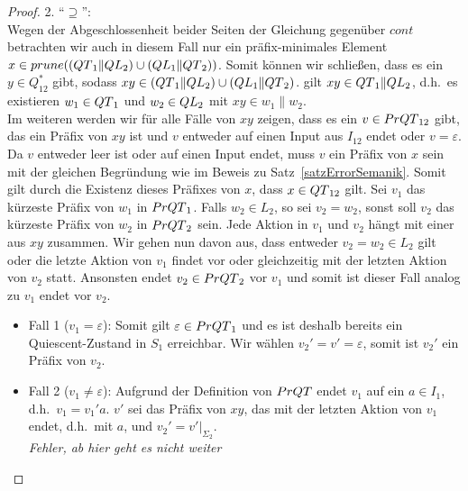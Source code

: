\begin{proof}
  2. ``$\supseteq$'':\\
  Wegen der Abgeschlossenheit beider Seiten der Gleichung gegenüber $cont$
  betrachten wir auch in diesem Fall nur ein präfix-minimales Element $x\in
  prune((QT{}_1\|QL{}_2)\cup (QL{}_1\|QT{}_2))$. Somit können wir schließen, dass es
  ein $y\in Q_{12}^*$ gibt, sodass $xy\in (QT{}_1\|QL{}_2)\cup (QL{}_1\|QT{}_2)$.
  \OBdA{} gilt $xy\in QT{}_1\|QL{}_2$, d.h.\ es existieren $w_1\in QT{}_1$ und
  $w_2\in QL{}_2$ mit $xy\in w_1\| w_2$.\\
  Im weiteren werden wir für alle Fälle von $xy$ zeigen, dass es ein $v\in
  PrQT{}_{12}$ gibt, das ein Präfix von $xy$ ist und $v$ entweder auf einen Input
  aus $I_{12}$ endet oder $v=\varepsilon$. Da $v$ entweder leer ist oder auf
  einen Input endet, muss $v$ ein Präfix von $x$ sein mit der gleichen
  Begründung wie im Beweis zu Satz~\ref{satzErrorSemanik}. Somit gilt durch die
  Existenz dieses Präfixes von $x$, dass $x\in QT{}_{12}$ gilt. Sei $v_1$ das
  kürzeste Präfix von $w_1$ in $PrQT{}_1$. Falls $w_2\in L_2$, so sei $v_2=w_2$,
  sonst soll $v_2$ das kürzeste Präfix von $w_2$ in $PrQT{}_2$ sein. Jede Aktion
  in $v_1$ und $v_2$ hängt mit einer aus $xy$ zusammen. Wir gehen nun davon
  aus, dass entweder $v_2=w_2\in L_2$ gilt oder die letzte Aktion von $v_1$
  findet vor oder gleichzeitig mit der letzten Aktion von $v_2$ statt.
  Ansonsten endet $v_2\in PrQT{}_2$ vor $v_1$ und somit ist dieser Fall analog zu
  $v_1$ endet vor $v_2$.
  \begin{itemize}
    \item Fall 1 ($v_1=\varepsilon$): Somit gilt $\varepsilon\in PrQT{}_1$ und es
      ist deshalb bereits ein Quiescent-Zustand in $S_1$ erreichbar. Wir wählen
      $v_2'=v'=\varepsilon$, somit ist $v_2'$ ein Präfix von $v_2$.
    \item Fall 2 ($v_1\neq \varepsilon$): Aufgrund der Definition von $PrQT{}$
      endet $v_1$ auf ein $a\in I_1$, d.h.\ $v_1=v_1'a$. $v'$ sei das Präfix
      von $xy$, das mit der letzten Aktion von $v_1$ endet, d.h.\ mit $a$, und
      $v_2'=v'|_{\Sigma _2}$.\\
      \emph{Fehler, ab hier geht es nicht weiter}
  \end{itemize}


\end{proof}

